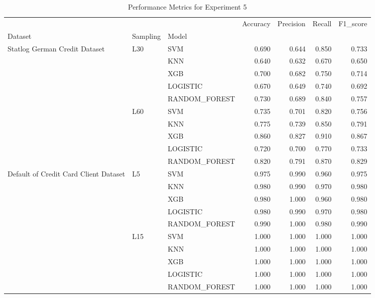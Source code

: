 \begin{table}
\caption{Performance Metrics for Experiment 5}
\label{tab:experiment_5_results}
\begin{tabular}{lllrrrr}
\toprule
 &  &  & Accuracy & Precision & Recall & F1\_score \\
Dataset & Sampling & Model &  &  &  &  \\
\midrule
\multirow[t]{10}{*}{Statlog German Credit Dataset} & \multirow[t]{5}{*}{L30} & SVM & 0.690 & 0.644 & 0.850 & 0.733 \\
 &  & KNN & 0.640 & 0.632 & 0.670 & 0.650 \\
 &  & XGB & 0.700 & 0.682 & 0.750 & 0.714 \\
 &  & LOGISTIC & 0.670 & 0.649 & 0.740 & 0.692 \\
 &  & RANDOM\_FOREST & 0.730 & 0.689 & 0.840 & 0.757 \\
\cline{2-7}
 & \multirow[t]{5}{*}{L60} & SVM & 0.735 & 0.701 & 0.820 & 0.756 \\
 &  & KNN & 0.775 & 0.739 & 0.850 & 0.791 \\
 &  & XGB & 0.860 & 0.827 & 0.910 & 0.867 \\
 &  & LOGISTIC & 0.720 & 0.700 & 0.770 & 0.733 \\
 &  & RANDOM\_FOREST & 0.820 & 0.791 & 0.870 & 0.829 \\
\cline{1-7} \cline{2-7}
\multirow[t]{10}{*}{Default of Credit Card Client Dataset} & \multirow[t]{5}{*}{L5} & SVM & 0.975 & 0.990 & 0.960 & 0.975 \\
 &  & KNN & 0.980 & 0.990 & 0.970 & 0.980 \\
 &  & XGB & 0.980 & 1.000 & 0.960 & 0.980 \\
 &  & LOGISTIC & 0.980 & 0.990 & 0.970 & 0.980 \\
 &  & RANDOM\_FOREST & 0.990 & 1.000 & 0.980 & 0.990 \\
\cline{2-7}
 & \multirow[t]{5}{*}{L15} & SVM & 1.000 & 1.000 & 1.000 & 1.000 \\
 &  & KNN & 1.000 & 1.000 & 1.000 & 1.000 \\
 &  & XGB & 1.000 & 1.000 & 1.000 & 1.000 \\
 &  & LOGISTIC & 1.000 & 1.000 & 1.000 & 1.000 \\
 &  & RANDOM\_FOREST & 1.000 & 1.000 & 1.000 & 1.000 \\
\cline{1-7} \cline{2-7}
\bottomrule
\end{tabular}
\end{table}

